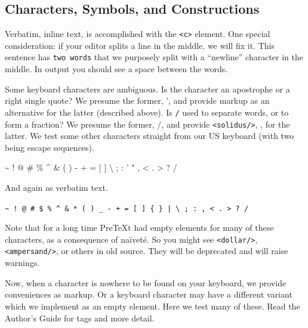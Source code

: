 \documentclass{amsart}
\theoremstyle{plain}%
\theoremstyle{definition}%
\theoremstyle{remark}%
\newcommand{\mono}[1]{\texttt{#1}}
\newcommand{\swungdash}{\raisebox{-2.25ex}{\scalebox{2}{\~{}}}}
\numberwithin{equation}{section}
\begin{document}
\subsection{Characters, Symbols, and Constructions}\label{section-text-paragraphs-8}%
Verbatim, inline text, is accomplished with the \mono{<c>} element.  One special consideration: if your editor splits a line in the middle, we will fix it.  This sentence has \mono{two words} that we purposely split with a ``newline'' character in the middle.  In output you should see a space between the words.%
\par
Some keyboard characters are ambiguous.  Is the character \mono{\textquotesingle{}} an apostrophe or a right single quote?  We presume the former, ', and provide markup as an alternative for the latter (described above).  Is \mono{/} used to separate words, or to form a fraction?  We presume the former, \slash{}, and provide \mono{<solidus/>}, \textfractionsolidus{}, for the latter.  We test some other characters straight from our US keyboard (with two being escape sequences).%
\par
\textasciitilde{} \textasciigrave{} ! @ \# \textdollar{} \% \textasciicircum{} \& \textasteriskcentered{} ( ) \textunderscore{} - + = [ ] \textbraceleft{} \textbraceright{} \textbar{} \textbackslash{} ; : ' " , \textless{} . \textgreater{} ? \slash{}%
\par
And again  as verbatim text.%
\par
\mono{\textasciitilde{} \textasciigrave{} ! @ \# \$ \% \textasciicircum{} \& * ( ) \_ - + = [ ] \{ \} | \textbackslash{} ; : \textquotesingle{} \textquotedbl{} , < . > ? /}%
\par
Note that for a long time PreTeXt had empty elements for many of these characters, as a consequence of naïveté.  So you might see \mono{<dollar/>}, \mono{<ampersand/>}, or others in old source.  They will be deprecated and will raise warnings.%
\par
Now, when a character is nowhere to be found on your keyboard, we provide conveniences as markup.  Or a keyboard character may have a different variant which we implement as an empty element.  Here we test many of these.  Read the Author's Guide for tags and more detail.%
\par
\textcopyright{}~~ \textcircledP{}~~ \textcopyleft{}~~ \textregistered{}~~ \texttrademark{}~~ \textservicemark{}~~ \textellipsis{}~~ \textperiodcentered{}~~ \swungdash{}~~ \textperthousand{}~~ \textpilcrow{}~~ \textsection{}~~ \textminus{}~~ \texttimes{}~~ \textfractionsolidus{}~~ \textdiv{}~~ \textpm{}%
\end{document}
